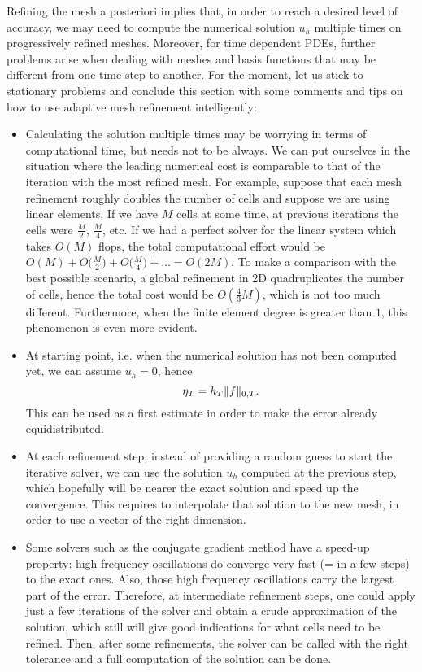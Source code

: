 
Refining the mesh a posteriori implies that, in order to reach a desired level of accuracy, we may need to compute the numerical solution $u_h$ multiple times on progressively refined meshes. Moreover, for time dependent PDEs, further problems arise when dealing with meshes and basis functions that may be different from one time step to another. For the moment, let us stick to stationary problems and conclude this section with some comments and tips on how to use adaptive mesh refinement intelligently:
\begin{itemize}
    \item Calculating the solution multiple times may be worrying in terms of computational time, but needs not to be always. We can put ourselves in the situation where the leading numerical cost is comparable to that of the iteration with the most refined mesh. For example, suppose that each mesh refinement roughly doubles the number of cells and suppose we are using linear elements. If we have $M$ cells at some time, at previous iterations the cells were $\frac{M}{2}$, $\frac{M}{4}$, etc. If we had a perfect solver for the linear system which takes $O(M)$ flops, the total computational effort would be $O(M)+O\bigl(\frac{M}{2}\bigr)+O\bigl(\frac{M}{4}\bigr)+\dots=O(2M)$. To make a comparison with the best possible scenario, a global refinement in 2D quadruplicates the number of cells, hence the total cost would be $O(\frac{4}{3}M)$, which is not too much different.
    Furthermore, when the finite element degree is greater than $1$, this phenomenon is even more evident.
    \item At starting point, i.e. when the numerical solution has not been computed yet, we can assume $u_h=0$, hence
    \[
    \eta_T = h_T \lVert f\rVert_{0,T}.
    \]
    This can be used as a first estimate in order to make the error already equidistributed.
    \item At each refinement step, instead of providing a random guess to start the iterative solver, we can use the solution $u_h$ computed at the previous step, which hopefully will be nearer the exact solution and speed up the convergence. This requires to interpolate that solution to the new mesh, in order to use a vector of the right dimension.
    \item Some solvers such as the conjugate gradient method have a speed-up property: high frequency oscillations do converge very fast (= in a few steps) to the exact ones. Also, those high frequency oscillations carry the largest part of the error. Therefore, at intermediate refinement steps, one could apply just a few iterations of the solver and obtain a crude approximation of the solution, which still will give good indications for what cells need to be refined. Then, after some refinements, the solver can be called with the right tolerance and a full computation of the solution can be done.

\end{itemize}
